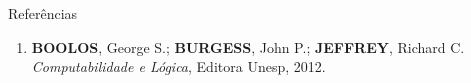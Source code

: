 \begin{frame}[fragile]{Referências}

    \begin{enumerate}
        \item \textbf{BOOLOS}, George S.; \textbf{BURGESS}, John P.; \textbf{JEFFREY}, Richard C.
            \textit{Computabilidade e Lógica}, Editora Unesp, 2012.

    \end{enumerate}

\end{frame}
